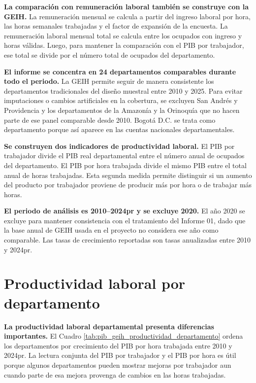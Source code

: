 \textbf{La comparación con remuneración laboral también se construye con la GEIH.} La remuneración mensual se calcula a partir del ingreso laboral por hora, las horas semanales trabajadas y el factor de expansión de la encuesta. La remuneración laboral mensual total se calcula entre los ocupados con ingreso y horas válidas. Luego, para mantener la comparación con el PIB por trabajador, ese total se divide por el número total de ocupados del departamento.

\textbf{El informe se concentra en 24 departamentos comparables durante todo el periodo.} La GEIH permite seguir de manera consistente los departamentos tradicionales del diseño muestral entre 2010 y 2025. Para evitar imputaciones o cambios artificiales en la cobertura, se excluyen San Andrés y Providencia y los departamentos de la Amazonía y la Orinoquía que no hacen parte de ese panel comparable desde 2010. Bogotá D.C. se trata como departamento porque así aparece en las cuentas nacionales departamentales.

\textbf{Se construyen dos indicadores de productividad laboral.} El PIB por trabajador divide el PIB real departamental entre el número anual de ocupados del departamento. El PIB por hora trabajada divide el mismo PIB entre el total anual de horas trabajadas. Esta segunda medida permite distinguir si un aumento del producto por trabajador proviene de producir más por hora o de trabajar más horas.

\textbf{El periodo de análisis es 2010--2024pr y se excluye 2020.} El año 2020 se excluye para mantener consistencia con el tratamiento del Informe 01, dado que la base anual de GEIH usada en el proyecto no considera ese año como comparable. Las tasas de crecimiento reportadas son tasas anualizadas entre 2010 y 2024pr.

\section{Productividad laboral por departamento}

\textbf{La productividad laboral departamental presenta diferencias importantes.} El Cuadro \ref{tab:pib_geih_productividad_departamento} ordena los departamentos por crecimiento del PIB por hora trabajada entre 2010 y 2024pr. La lectura conjunta del PIB por trabajador y el PIB por hora es útil porque algunos departamentos pueden mostrar mejoras por trabajador aun cuando parte de esa mejora provenga de cambios en las horas trabajadas.




